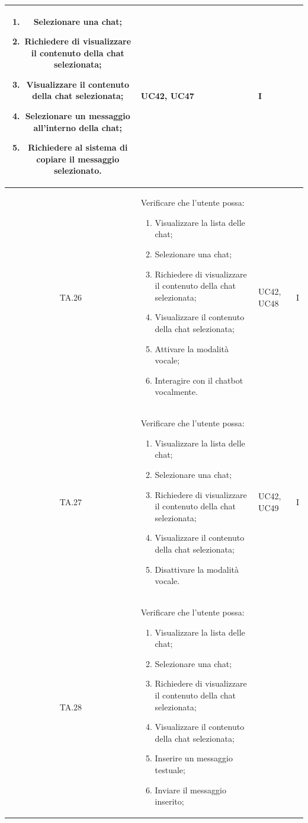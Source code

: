 \documentclass[10pt, a4paper]{article}
\begin{document}
\begin{xltabular}{\textwidth}{|c|X|p{2.5cm}|c|}
\begin{enumerate}
    \item Selezionare una chat;
    \item Richiedere di visualizzare il contenuto della chat selezionata;
    \item Visualizzare il contenuto della chat selezionata;
    \item Selezionare un messaggio all'interno della chat;
    \item Richiedere al sistema di copiare il messaggio selezionato.
\end{enumerate}
& UC42, UC47 & I \\
\hline
TA.26 & Verificare che l'utente possa:
\begin{enumerate}
    \item Visualizzare la lista delle chat;
    \item Selezionare una chat;
    \item Richiedere di visualizzare il contenuto della chat selezionata;
    \item Visualizzare il contenuto della chat selezionata;
    \item Attivare la modalità vocale;
    \item Interagire con il chatbot vocalmente.
\end{enumerate}
& UC42, UC48 & I \\
\hline
TA.27 & Verificare che l'utente possa:
\begin{enumerate}
    \item Visualizzare la lista delle chat;
    \item Selezionare una chat;
    \item Richiedere di visualizzare il contenuto della chat selezionata;
    \item Visualizzare il contenuto della chat selezionata;
    \item Disattivare la modalità vocale.
\end{enumerate}
& UC42, UC49 & I \\
\hline
TA.28 & Verificare che l'utente possa:
\begin{enumerate}
    \item Visualizzare la lista delle chat;
    \item Selezionare una chat;
    \item Richiedere di visualizzare il contenuto della chat selezionata;
    \item Visualizzare il contenuto della chat selezionata;
    \item Inserire un messaggio testuale;
    \item Inviare il messaggio inserito;

\end{enumerate}
\end{xltabular}
\end{document}
